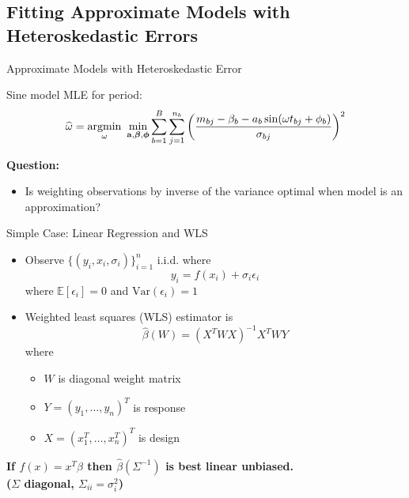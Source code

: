 \documentclass[12pt]{beamer}
\newcommand{\argmin}[1]{\underset{#1}{\operatorname{argmin}}\text{ }}
\newcommand{\Var}{\text{Var}}
\newcommand{\E}{\mathbb{E}}
\newcommand{\V}[1]{{\bm{\mathbf{\MakeLowercase{#1}}}}} %
\begin{document}
\subsection{Fitting Approximate Models with Heteroskedastic Errors}

\begin{frame}{Approximate Models with Heteroskedastic Error}

  Sine model MLE for period:
  \begin{equation*}
    \widehat{\omega} = \argmin{\omega} \min_{\V{a},\V{\beta},\V{\phi}} \sum_{b=1}^B \sum_{j=1}^{n_b} \left(\frac{m_{bj} - \beta_{b} - a_b\sin(\omega t_{bj} + \phi_b)}{\sigma_{bj}}\right)^2
  \end{equation*}
  
  
  

  \textbf{Question:}
  \begin{itemize}
  \item Is weighting observations by inverse of the variance optimal when model is an approximation?
  \end{itemize}
  
\end{frame}

\begin{frame}{Simple Case: Linear Regression and WLS}
\begin{itemize}
\item Observe $\{(y_i,x_i,\sigma_i)\}_{i=1}^n$ i.i.d. where
  \begin{equation*}
    y_i = f(x_i) + \sigma_i\epsilon_i 
  \end{equation*}
  where $\E[\epsilon_i] = 0$  and $\Var(\epsilon_i) = 1$
\item Weighted least squares (WLS) estimator is
  \begin{equation*}
    \widehat{\beta}(W) = (X^TWX)^{-1}X^TWY
  \end{equation*}
  where
  \begin{itemize}
    \item $W$ is diagonal weight matrix
    \item $Y = (y_1,\ldots,y_n)^T$ is response
    \item $X = (x_1^T,\ldots,x_n^T)^T$ is design
  \end{itemize}
\end{itemize}

\begin{center}
\textbf{If $f(x) = x^T\beta$ then $\widehat{\beta}(\Sigma^{-1})$ is best linear unbiased.\\ ($\Sigma$ diagonal, $\Sigma_{ii} = \sigma_i^2$)}
\end{center}
\end{frame}
\end{document}
